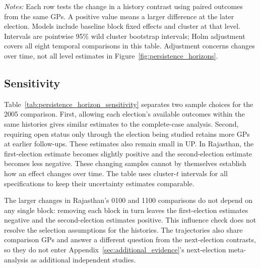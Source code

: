 \begin{table}[!htbp]
\centering
\caption{Changes in history contrasts across open elections}
\label{tab:persistence_horizon_changes}

\begin{minipage}{\textwidth}\small
\emph{Notes:} Each row tests the change in a history contrast using paired outcomes from the same GPs. A positive value means a larger difference at the later election. Models include baseline block fixed effects and cluster at that level. Intervals are pointwise 95\% wild cluster bootstrap intervals; Holm adjustment covers all eight temporal comparisons in this table. Adjustment concerns changes over time, not all level estimates in Figure~\ref{fig:persistence_horizons}.
\end{minipage}
\end{table}
\FloatBarrier

\subsection{Sensitivity}

Table~\ref{tab:persistence_horizon_sensitivity} separates two sample choices for the 2005 comparison. First, allowing each election's available outcomes within the same histories gives similar estimates to the complete-case analysis. Second, requiring open status only through the election being studied retains more GPs at earlier follow-ups. These estimates also remain small in UP. In Rajasthan, the first-election estimate becomes slightly positive and the second-election estimate becomes less negative. These changing samples cannot by themselves establish how an effect changes over time. The table uses cluster-$t$ intervals for all specifications to keep their uncertainty estimates comparable.

The larger changes in Rajasthan's 0100 and 1100 comparisons do not depend on any single block: removing each block in turn leaves the first-election estimates negative and the second-election estimates positive. This influence check does not resolve the selection assumptions for the histories. The trajectories also share comparison GPs and answer a different question from the next-election contrasts, so they do not enter Appendix~\ref{sec:additional_evidence}'s next-election meta-analysis as additional independent studies.

